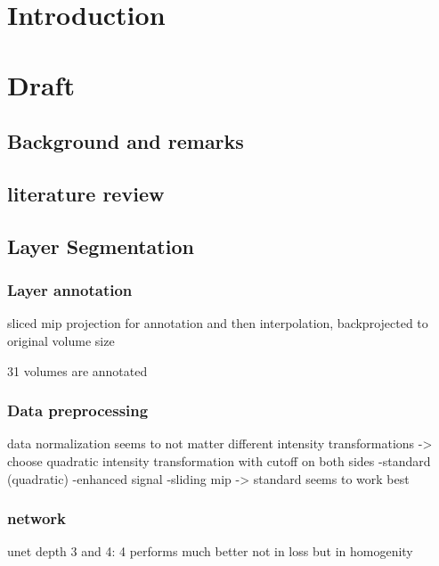 \documentclass[a4paper,11pt,english,german]{book}
\begin{document}


% 

\clearpage{}
\addtolength{\parskip}{-0pt}\tableofcontents{}%
\clearpage{}
\listoffigures
{}
\clearpage{}
\listoftables
{}
\clearpage{}
%
%
\mainmatter

\chapter{Introduction}
\chapter{Draft}
\section{Background and remarks}

\section{literature review}


\section{Layer Segmentation}
\subsection{Layer annotation}
sliced mip projection for annotation and then interpolation, backprojected to original volume size

31 volumes are annotated
\subsection{Data preprocessing}
data normalization seems to not matter
different intensity transformations -> choose quadratic intensity transformation with cutoff on both sides
-standard (quadratic)
-enhanced signal
-sliding mip
-> standard seems to work best




\subsection{network}
unet depth 3 and 4: 4 performs much better not in loss but in homogenity
\end{document}
